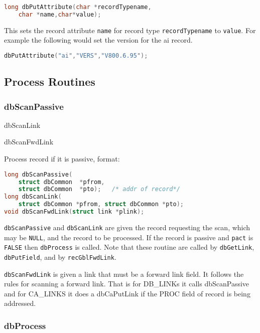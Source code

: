 \begin{lstlisting}[language=C]
long dbPutAttribute(char *recordTypename,
    char *name,char*value);
\end{lstlisting}

This sets the record attribute \verb|name| for record type \verb|recordTypename| to \verb|value|.
For example the following would set the version for the ai record.

\begin{lstlisting}[language=C]
dbPutAttribute("ai","VERS","V800.6.95");
\end{lstlisting}

\subsection{Process Routines}

\subsubsection{dbScanPassive}

dbScanLink

dbScanFwdLink

Process record if it is passive, format:

\begin{lstlisting}[language=C]
long dbScanPassive(
    struct dbCommon  *pfrom,
    struct dbCommon  *pto);   /* addr of record*/
long dbScanLink(
    struct dbCommon *pfrom, struct dbCommon *pto);
void dbScanFwdLink(struct link *plink);
\end{lstlisting}

 \verb|dbScanPassive| and \verb|dbScanLink| are given the record requesting the scan, which may be \verb|NULL|, and the record to be processed.
If the record is passive and \verb|pact| is \verb|FALSE| then \verb|dbProcess| is called.
Note that these routine are called by \verb|dbGetLink|, \verb|dbPutField|, and by \verb|recGblFwdLink|.

\verb|dbScanFwdLink| is given a link that must be a forward link field.
It follows the rules for scanning a forward link.
That is for DB\_LINKs it calls dbScanPassive and for CA\_LINKS it does a dbCaPutLink if the PROC field of record is being addressed.

\subsubsection{dbProcess }

